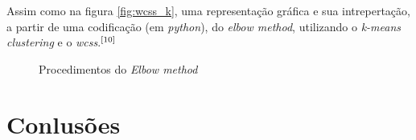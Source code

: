 \documentclass[12pt, a4paper, oneside]{scrreport}
\begin{document}
\quad Assim como na figura \ref{fig:wcss_k}, uma representação gráfica e sua intrepertação, a partir de uma codificação (em \textit{python}), do \textit{elbow method}, utilizando o \textit{k-means clustering} e o \textit{wcss}.\hyperlink{elbow_method}{\large$\bigskip^{[10]}$}
 
\begin{figure}[h]
\begin{center}
\end{center}
\caption{\normalfont Procedimentos do \textit{Elbow method}}
\end{figure}

\newpage
\chapter{Conlusões}

\renewcommand\refname{Referências}
\end{document}
